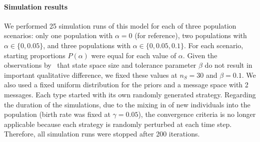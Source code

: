 \documentclass[a4paper]{article}
\begin{document}
\paragraph{Simulation results}
We performed 25 simulation runs of this model for each of three population scenarios: only one population with $\alpha = 0$ (for reference), two populations with $\alpha \in \{0, 0.05\}$, and three populations with $\alpha \in \{0, 0.05, 0.1\}$.
For each scenario, starting proportions $P(\alpha)$ were equal for each value of $\alpha$.
Given the observations by~\textcite{franke_vagueness_2017} that state space size and tolerance parameter $\beta$ do not result in important qualitative difference, we fixed these values at $n_S = 30$ and $\beta = 0.1$.
We also used a fixed uniform distribution for the priors and a message space with 2 messages.
Each type started with its own randomly generated strategy.
Regarding the duration of the simulations, due to the mixing in of new individuals into the population (birth rate was fixed at $\gamma = 0.05$), the convergence criteria is no longer applicable because each strategy is randomly perturbed at each time step.
Therefore, all simulation runs were stopped after 200 iterations.
\end{document}

